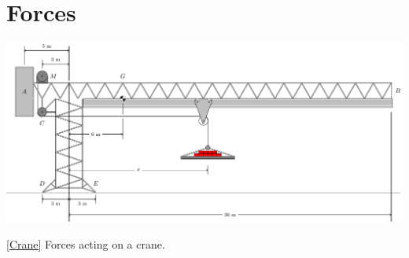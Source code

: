 \documentclass[oneside]{book}
\begin{document}
\chapter{Forces}
\begin{center}
    \includegraphics[width=\textwidth,page=1]{../images/Crane/Crane.pdf}
    \captionsetup{type=figure}
    \caption[figure]{\ref{Crane} Forces acting on a crane.}
\end{center}
\end{document}
